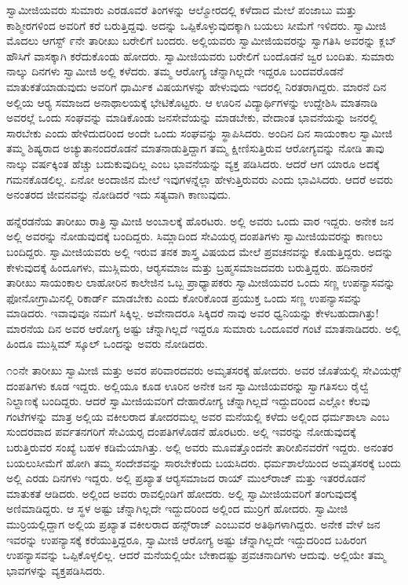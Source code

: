  ಸ್ವಾಮೀಜಿಯವರು ಸುಮಾರು ಎರಡೂವರೆ ತಿಂಗಳನ್ನು ಆಲ್ಮೋರದಲ್ಲಿ ಕಳೆದಾದ ಮೇಲೆ ಪಂಜಾಬು ಮತ್ತು ಕಾಶ್ಮೀರಗಳಿಂದ ಅವರಿಗೆ ಕರೆ ಬರುತ್ತಿದ್ದವು. ಅದನ್ನು ಒಪ್ಪಿಕೊಳ್ಳುವುದಕ್ಕಾಗಿ ಬಯಲು ಸೀಮೆಗೆ ಇಳಿದರು. ಸ್ವಾಮೀಜಿ ಮೊದಲು ಆಗಸ್ಟ್ ೯ನೇ ತಾರೀಖು ಬರೇಲಿಗೆ ಬಂದರು. ಅಲ್ಲಿಯವರು ಸ್ವಾಮೀಜಿಯವರನ್ನು ಸ್ವಾಗತಿಸಿ ಅವರನ್ನು ಕ್ಲಬ್ ಹೌಸಿಗೆ ವಾಸಕ್ಕಾಗಿ ಕರೆದುಕೊಂಡು ಹೋದರು. ಸ್ವಾಮೀಜಿಯವರು ಬರೇಲಿಗೆ ಬಂದೊಡನೆ ಜ್ವರ ಬಂದಿತು. ಸುಮಾರು ನಾಲ್ಕು ದಿನಗಳು ಸ್ವಾಮೀಜಿ ಅಲ್ಲಿ ಕಳೆದರು. ತಮ್ಮ ಆರೋಗ್ಯ ಚೆನ್ನಾಗಿಲ್ಲದೇ ಇದ್ದರೂ ಬಂದವರೊಡನೆ ಮಾತುಕತೆಯಾಡುವುದು ಅವರಿಗೆ ಧಾರ್ಮಿಕ ವಿಷಯಗಳನ್ನು ಹೇಳುವುದು ಇದರಲ್ಲಿ ನಿರತರಾಗಿದ್ದರು. ಮಾರನೆ ದಿನ ಅಲ್ಲಿಯ ಆರ‍್ಯ ಸಮಾಜದ ಅನಾಥಾಲಯಕ್ಕೆ ಭೇಟಿಕೊಟ್ಟರು. ಆ ಊರಿನ ವಿದ್ಯಾರ್ಥಿಗಳನ್ನು ಉದ್ದೇಶಿಸಿ ಮಾತನಾಡಿ ಅವರಲ್ಲೆ ಒಂದು ಸಂಘವನ್ನು ಮಾಡಿಕೊಂಡು ಜನಸೇವೆಯನ್ನು ಮಾಡಬೇಕು, ವೇದಾಂತ ಭಾವನೆಯನ್ನು ಜನರಲ್ಲಿ ಸಾರಬೇಕು ಎಂದು ಹೇಳಿದುದರಿಂದ ಅಂದೇ ಒಂದು ಸಂಘವನ್ನು ಸ್ಥಾಪಿಸಿದರು. ಅಂದಿನ ದಿನ ಸಾಯಂಕಾಲ ಸ್ವಾಮೀಜಿ ತಮ್ಮ ಶಿಷ್ಯರಾದ ಅಚ್ಯುತಾನಂದರೊಡನೆ ಮಾತನಾಡುತ್ತಿದ್ದಾಗ ತಮ್ಮ ಕ್ಷೀಣಿಸುತ್ತಿರುವ ಆರೋಗ್ಯವನ್ನು ನೋಡಿ ತಾವು ನಾಲ್ಕು ವರ್ಷಕ್ಕಿಂತ ಹೆಚ್ಚು ಬದುಕುವುದಿಲ್ಲ ಎಂಬ ಭಾವನೆಯನ್ನು ವ್ಯಕ್ತ ಪಡಿಸಿದರು. ಆದರೆ ಆಗ ಯಾರೂ ಅದಕ್ಕೆ ಗಮನಕೊಡಲಿಲ್ಲ. ಏನೋ ಅಂದಾಜಿನ ಮೇಲೆ ಇವುಗಳನ್ನೆಲ್ಲಾ ಹೇಳುತ್ತಿರುವರು ಎಂದು ಭಾವಿಸಿದರು. ಆದರೆ ಅವರು ಅನಂತರದ ಜೀವನವನ್ನು ನೋಡಿದರೆ ಇದು ಸತ್ಯವಾಗಿ ಕಾಣುವುದು. 

 ಹನ್ನೆರಡನೆಯ ತಾರೀಖು ರಾತ್ರಿ ಸ್ವಾಮೀಜಿ ಅಂಬಾಲಕ್ಕೆ ಹೊರಟರು. ಅಲ್ಲಿ ಅವರು ಒಂದು ವಾರ ಇದ್ದರು. ಅನೇಕ ಜನ ಅಲ್ಲಿ ಅವರನ್ನು ನೋಡುವುದಕ್ಕೆ ಬಂದಿದ್ದರು. ಸಿಮ್ಲಾದಿಂದ ಸೇವಿಯರ‍್ಸ ದಂಪತಿಗಳು ಸ್ವಾಮೀಜಿಯವರನ್ನು ಕಾಣಲು ಬಂದಿದ್ದರು. ಸ್ವಾಮೀಜಿಯವರು ಅಲ್ಲಿ ಇರುವ ತನಕ ಶಾಸ್ತ್ರ ವಿಷಯದ ಮೇಲೆ ಪ್ರವಚನವನ್ನು ಕೊಡುತ್ತಿದ್ದರು. ಅದನ್ನು ಕೇಳುವುದಕ್ಕೆ ಹಿಂದೂಗಳು, ಮುಸ್ಲಿಮರು, ಆರ‍್ಯಸಮಾಜ ಮತ್ತು ಬ್ರಹ್ಮಸಮಾಜದವರು ಬರುತ್ತಿದ್ದರು. ಹದಿನಾರನೆ ತಾರೀಖು ಸಾಯಂಕಾಲ ಲಾಹೋರಿನ ಕಾಲೇಜಿನ ಒಬ್ಬ ಪ್ರಾಧ್ಯಾಪಕರು ಸ್ವಾಮೀಜಿಯವರ ಒಂದು ಸಣ್ಣ ಉಪನ್ಯಾಸವನ್ನು ಫೋನೋಗ್ರಾಮಿನಲ್ಲಿ ರಿಕಾರ್ಡ್ ಮಾಡಬೇಕು ಎಂದು ಕೋರಿಕೊಂಡ ಪ್ರಯುಕ್ತ ಒಂದು ಸಣ್ಣ ಉಪನ್ಯಾಸವನ್ನು ಮಾಡಿದರು. ಇವಾವುವೂ ನಮಗೆ ಸಿಕ್ಕಿಲ್ಲ. ಅವೇನಾದರೂ ಸಿಕ್ಕಿದರೆ ನಾವು ಅವರ ಧ್ವನಿಯನ್ನು ಕೇಳಬಹುದಾಗಿತ್ತು! ಮಾರನೆಯ ದಿನ ಅವರ ಆರೋಗ್ಯ ಅಷ್ಟು ಚೆನ್ನಾಗಿಲ್ಲದೆ ಇದ್ದರೂ ಸುಮಾರು ಒಂದೂವರೆ ಗಂಟೆ ಮಾತನಾಡಿದರು. ಅಲ್ಲಿ ಹಿಂದೂ ಮುಸ್ಲಿಮ್ ಸ್ಕೂಲ್ ಒಂದನ್ನು ಅವರು ನೋಡಿದರು. 

 ೧೦ನೇ ತಾರೀಖು ಸ್ವಾಮೀಜಿ ಮತ್ತು ಅವರ ಪರಿವಾರದವರು ಅಮೃತಸರಕ್ಕೆ ಹೋದರು. ಅವರ ಜೊತೆಯಲ್ಲಿ ಸೇವಿಯರ್ಸ್‍‍ ದಂಪತಿಗಳು ಕೂಡ ಇದ್ದರು. ಅಲ್ಲಿಯೂ ಕೂಡ ಊರಿನ ಅನೇಕ ಜನ ಸ್ವಾಮೀಜಿಯವರನ್ನು ಸ್ವಾಗತಿಸಲು ರೈಲ್ವೆ ನಿಲ್ದಾಣಕ್ಕೆ ಬಂದಿದ್ದರು. ಆದರೆ ಸ್ವಾಮೀಜಿಯವರಿಗೆ ದೇಹಾರೋಗ್ಯ ಚೆನ್ನಾಗಿಲ್ಲದೆ ಇದ್ದುದರಿಂದ ಎಲ್ಲೋ ಕೆಲವು ಗಂಟೆಗಳನ್ನು ಮಾತ್ರ ಅಲ್ಲಿಯ ವಕೀಲರಾದ ತೋದರಮಲ್ಲ ಅವರ ಮನೆಯಲ್ಲಿ ಕಳೆದು ಅಲ್ಲಿಂದ ಧರ್ಮಶಾಲಾ ಎಂಬ ಸುಂದರವಾದ ಪರ್ವತನಗರಿಗೆ ಸೇವಿಯರ‍್ಸ ದಂಪತಿಗಳೊಡನೆ ಹೊರಟರು. ಅಲ್ಲಿ ಇವರನ್ನು ನೋಡುವುದಕ್ಕೆ ಬರುತ್ತಿರುವರ ಸಂಖ್ಯೆ ಬಹಳ ಕಡಿಮೆಯಾಗಿತ್ತು. ಅಲ್ಲಿ ಅವರು ಮೂವತ್ತೊಂದನೇ ತಾರೀಖಿನವರೆಗೆ ಇದ್ದರು. ಅನಂತರ ಬಯಲುಸೀಮೆಗೆ ಹೋಗಿ ತಮ್ಮ ಸಂದೇಶವನ್ನು ಸಾರಬೇಕೆಂದು ಬಯಸಿದರು. ಧರ್ಮಶಾಲೆಯಿಂದ ಅಮೃತಸರಕ್ಕೆ ಬಂದು ಅಲ್ಲಿ ಎರಡು ದಿನಗಳು ಇದ್ದರು. ಅಲ್ಲಿ ಪ್ರಖ್ಯಾತ ಆರ‍್ಯಸಮಾಜದ ರಾಯ್ ಮುಲ್‍ರಾಜ್ ಮತ್ತು ಇತರರೊಡನೆ ಮಾತುಕತೆ ಆಡಿದರು. ಅಲ್ಲಿಂದ ಅವರು ರಾವಲ್ಪಿಂಡಿಗೆ ಹೋದರು. ಅಲ್ಲಿ ಸ್ವಾಮೀಜಿಯವರಿಗೆ ತಂಗುವುದಕ್ಕೆ ಅಣಿಮಾಡಿದ್ದರು. ಆ ಸ್ಥಳ ಅಷ್ಟು ಚೆನ್ನಾಗಿಲ್ಲದೇ ಇದ್ದುದರಿಂದ ಅಲ್ಲಿಂದ ಮುರ‍್ರಿಗೆ ಹೋದರು. ಸ್ವಾಮೀಜಿ ಮುರ‍್ರಿಯಲ್ಲಿದ್ದಾಗ ಅಲ್ಲಿಯ ಪ್ರಖ್ಯಾತ ವಕೀಲರಾದ ಹನ್ಸ್‌ರಾಜ್ ಎಂಬುವರ ಅತಿಥಿಗಳಾಗಿದ್ದರು. ಅನೇಕ ವೇಳೆ ಜನ ಇವರನ್ನು ಉಪನ್ಯಾಸಕ್ಕೆ ಕರೆಯುತ್ತಿದ್ದರೂ, ಸ್ವಾಮೀಜಿ ಆರೋಗ್ಯ ಅಷ್ಟು ಚೆನ್ನಾಗಿಲ್ಲದೇ ಇದ್ದುದರಿಂದ ಬಹಿರಂಗ ಉಪನ್ಯಾಸವನ್ನು ಒಪ್ಪಿಕೊಳ್ಳಲಿಲ್ಲ. ಆದರೆ ಮನೆಯಲ್ಲಿಯೇ ಬೇಕಾದಷ್ಟು ಪ್ರವಚನಾದಿಗಳು ಆದುವು. ಅಲ್ಲಿಯೇ ತಮ್ಮ ಭಾವಗಳನ್ನು ವ್ಯಕ್ತಪಡಿಸಿದರು. 

